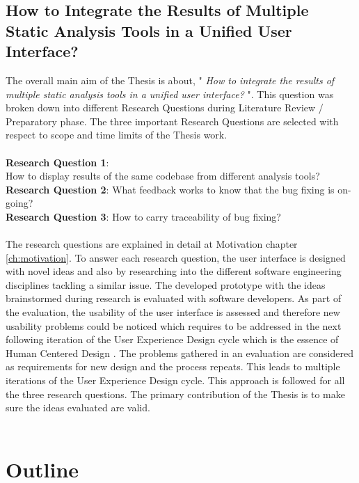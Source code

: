 \subsection{How to Integrate the Results of Multiple Static Analysis Tools in a Unified User Interface?}

The overall main aim of the Thesis is about, " \textit{How to integrate the results of multiple static analysis tools in a unified user interface?} ". This question was broken down into different Research Questions during Literature Review / Preparatory phase. The three important Research Questions are selected with respect to scope and time limits of the Thesis work. \\ \\

\noindent\textbf{Research Question 1}: \\ How to display results of the same codebase from different analysis tools? \\
\textbf{Research Question 2}: What feedback works to know that the bug fixing is on-going? \\
\textbf{Research Question 3}: How to carry traceability of bug fixing? \\ \\

The research questions are explained in detail at Motivation chapter \ref{ch:motivation}. To answer each research question, the user interface is designed with novel ideas and also by researching into  the different software engineering disciplines tackling a similar issue. The developed prototype with the ideas brainstormed during research is evaluated with software developers. As part of the evaluation, the usability  \cite{usability} of the user interface is assessed and therefore new usability problems could be noticed which requires to be addressed in the next following iteration of the User Experience Design cycle \cite{UXD} which is the essence of Human Centered Design \cite{hcd}. The problems gathered in an evaluation are considered as requirements for new design and the process repeats. This leads to multiple iterations of the User Experience Design cycle. This approach is followed for all the three research questions. The primary contribution of the Thesis is to make sure the ideas evaluated are valid. \\ \\

\section{Outline}

